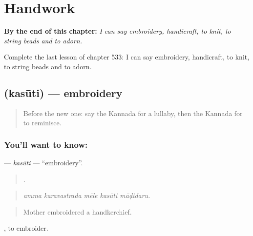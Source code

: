 
\chapter{Handwork}
\label{ch:ka-handwork}

\begin{chapteropening}
\textbf{By the end of this chapter:} \emph{I can say embroidery, handicraft, to knit, to string beads and to adorn.}

Complete the last lesson of chapter 533: I can say embroidery, handicraft, to knit, to string beads and to adorn.
\end{chapteropening}

\section[\texorpdfstring{\kn{ಕಸೂತಿ} (kasūti)}{ಕಸೂತಿ (kasūti)}]{ (kasūti) — embroidery}

\label{lesson:KA-C533-kasuti}



\begin{quote}
Before the new one: say the Kannada for a lullaby, then the Kannada for to reminisce.
\end{quote}

\subsection*{You'll want to know: }
\textbf{} — \emph{kasūti} — \textquotedblleft{}embroidery\textquotedblright{}.

\begin{quote}
    .
\end{quote}

\begin{quote}
\emph{amma karavastrada mēle kasūti māḍidaru.}
\end{quote}

\begin{quote}
Mother embroidered a handkerchief.
\end{quote}

 , to embroider.

